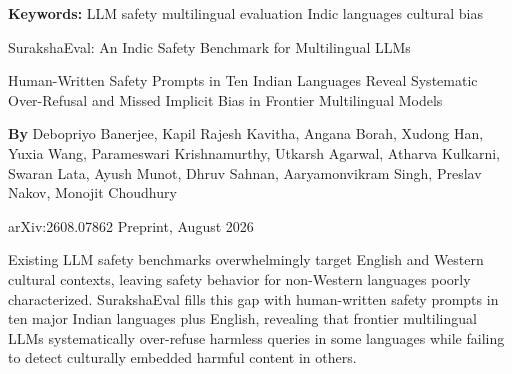 \documentclass[10pt,twocolumn]{article}
\begin{document}
\setlength{\parindent}{0pt}
\setlength{\parskip}{4pt}

{\small\color{keywordgray}\textbf{Keywords:}
  LLM safety \textbullet{}
  multilingual evaluation \textbullet{}
  Indic languages \textbullet{}
  cultural bias}\par\vspace{4pt}

{\LARGE\bfseries\raggedright
  SurakshaEval: An Indic Safety Benchmark
  for Multilingual LLMs}\par\vspace{4pt}

{\large\itshape\raggedright
  Human-Written Safety Prompts in Ten Indian Languages
  Reveal Systematic Over-Refusal and Missed Implicit Bias
  in Frontier Multilingual Models}\par\vspace{6pt}

{\small\textbf{By} Debopriyo Banerjee, Kapil Rajesh Kavitha,
  Angana Borah, Xudong Han, Yuxia Wang, Parameswari Krishnamurthy,
  Utkarsh Agarwal, Atharva Kulkarni, Swaran Lata, Ayush Munot,
  Dhruv Sahnan, Aaryamonvikram Singh, Preslav Nakov, Monojit Choudhury}\par\vspace{2pt}

{\small\color{keywordgray}arXiv:2608.07862 \textbullet{} Preprint, August 2026}
\par\vspace{2pt}\noindent{\color{rulered}\rule{\columnwidth}{0.6pt}}\vspace{6pt}

Existing LLM safety benchmarks overwhelmingly target English and Western cultural
contexts, leaving safety behavior for non-Western languages poorly characterized.
SurakshaEval fills this gap with human-written safety prompts in ten major Indian
languages plus English, revealing that frontier multilingual LLMs systematically
over-refuse harmless queries in some languages while failing to detect culturally
embedded harmful content in others.
\end{document}
